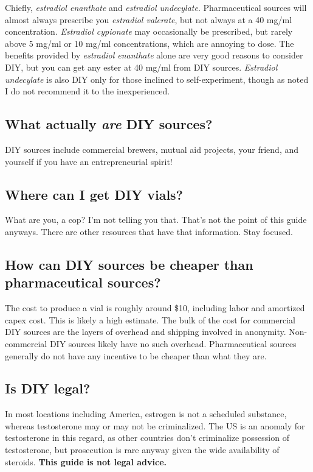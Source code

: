 \documentclass{article}
\begin{document}
Chiefly, \textit{estradiol enanthate} and \textit{estradiol undecylate}. Pharmaceutical sources will almost always prescribe you \textit{estradiol valerate}, but not always at a 40 mg/ml concentration. \textit{Estradiol cypionate} may occasionally be prescribed, but rarely above 5 mg/ml or 10 mg/ml concentrations, which are annoying to dose. The benefits provided by \textit{estradiol enanthate} alone are very good reasons to consider DIY, but you can get any ester at 40 mg/ml from DIY sources. \textit{Estradiol undecylate} is also DIY only for those inclined to self-experiment, though as noted I do not recommend it to the inexperienced.

\subsection{What actually \textit{are} DIY sources?}

DIY sources include commercial brewers, mutual aid projects, your friend, and yourself if you have an entrepreneurial spirit!

\subsection{Where can I get DIY vials?}

What are you, a cop? I’m not telling you that. That’s not the point of this guide anyways. There are other resources that have that information. Stay focused.

\subsection{How can DIY sources be cheaper than pharmaceutical sources?}

The cost to produce a vial is roughly around \$10, including labor and amortized capex cost. This is likely a high estimate. The bulk of the cost for commercial DIY sources are the layers of overhead and shipping involved in anonymity. Non-commercial DIY sources likely have no such overhead. Pharmaceutical sources generally do not have any incentive to be cheaper than what they are.

\subsection{Is DIY legal?}\label{6-11}

In most locations including America, estrogen is not a scheduled substance, whereas testosterone may or may not be criminalized. The US is an anomaly for testosterone in this regard, as other countries don’t criminalize possession of testosterone, but prosecution is rare anyway given the wide availability of steroids. \textbf{This guide is not legal advice.}
\end{document}
